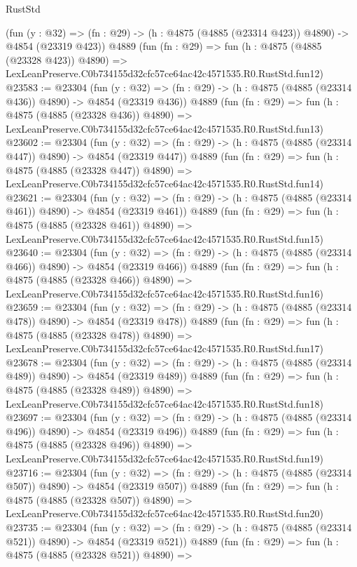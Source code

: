 \begin{lexlean}{RustStd}
\begin{coremodule}
    (fun (y : @32) => (fn : @29) -> (h : @4875 (@4885 (@23314 @423)) @4890) -> @4854 (@23319 @423))
    @4889
    (fun (fn : @29) =>
    fun (h : @4875 (@4885 (@23328 @423)) @4890) =>
    LexLeanPreserve.C0b734155d32cfc57ce64ac42c4571535.R0.RustStd.fun12)
@23583 := @23304
    (fun (y : @32) => (fn : @29) -> (h : @4875 (@4885 (@23314 @436)) @4890) -> @4854 (@23319 @436))
    @4889
    (fun (fn : @29) =>
    fun (h : @4875 (@4885 (@23328 @436)) @4890) =>
    LexLeanPreserve.C0b734155d32cfc57ce64ac42c4571535.R0.RustStd.fun13)
@23602 := @23304
    (fun (y : @32) => (fn : @29) -> (h : @4875 (@4885 (@23314 @447)) @4890) -> @4854 (@23319 @447))
    @4889
    (fun (fn : @29) =>
    fun (h : @4875 (@4885 (@23328 @447)) @4890) =>
    LexLeanPreserve.C0b734155d32cfc57ce64ac42c4571535.R0.RustStd.fun14)
@23621 := @23304
    (fun (y : @32) => (fn : @29) -> (h : @4875 (@4885 (@23314 @461)) @4890) -> @4854 (@23319 @461))
    @4889
    (fun (fn : @29) =>
    fun (h : @4875 (@4885 (@23328 @461)) @4890) =>
    LexLeanPreserve.C0b734155d32cfc57ce64ac42c4571535.R0.RustStd.fun15)
@23640 := @23304
    (fun (y : @32) => (fn : @29) -> (h : @4875 (@4885 (@23314 @466)) @4890) -> @4854 (@23319 @466))
    @4889
    (fun (fn : @29) =>
    fun (h : @4875 (@4885 (@23328 @466)) @4890) =>
    LexLeanPreserve.C0b734155d32cfc57ce64ac42c4571535.R0.RustStd.fun16)
@23659 := @23304
    (fun (y : @32) => (fn : @29) -> (h : @4875 (@4885 (@23314 @478)) @4890) -> @4854 (@23319 @478))
    @4889
    (fun (fn : @29) =>
    fun (h : @4875 (@4885 (@23328 @478)) @4890) =>
    LexLeanPreserve.C0b734155d32cfc57ce64ac42c4571535.R0.RustStd.fun17)
@23678 := @23304
    (fun (y : @32) => (fn : @29) -> (h : @4875 (@4885 (@23314 @489)) @4890) -> @4854 (@23319 @489))
    @4889
    (fun (fn : @29) =>
    fun (h : @4875 (@4885 (@23328 @489)) @4890) =>
    LexLeanPreserve.C0b734155d32cfc57ce64ac42c4571535.R0.RustStd.fun18)
@23697 := @23304
    (fun (y : @32) => (fn : @29) -> (h : @4875 (@4885 (@23314 @496)) @4890) -> @4854 (@23319 @496))
    @4889
    (fun (fn : @29) =>
    fun (h : @4875 (@4885 (@23328 @496)) @4890) =>
    LexLeanPreserve.C0b734155d32cfc57ce64ac42c4571535.R0.RustStd.fun19)
@23716 := @23304
    (fun (y : @32) => (fn : @29) -> (h : @4875 (@4885 (@23314 @507)) @4890) -> @4854 (@23319 @507))
    @4889
    (fun (fn : @29) =>
    fun (h : @4875 (@4885 (@23328 @507)) @4890) =>
    LexLeanPreserve.C0b734155d32cfc57ce64ac42c4571535.R0.RustStd.fun20)
@23735 := @23304
    (fun (y : @32) => (fn : @29) -> (h : @4875 (@4885 (@23314 @521)) @4890) -> @4854 (@23319 @521))
    @4889
    (fun (fn : @29) =>
    fun (h : @4875 (@4885 (@23328 @521)) @4890) =>

\end{coremodule}
\end{lexlean}
